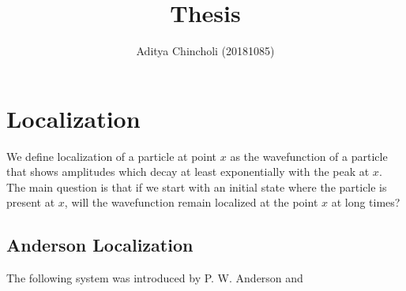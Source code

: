 \documentclass{article}
\title{Thesis}
\author{Aditya Chincholi (20181085)}
\begin{document}
\maketitle




\section{Localization}
We define localization of a particle at point $x$ as the wavefunction of a
particle that shows amplitudes which decay at least exponentially with the peak at $x$. 
The main question is that if we start with an initial state where the
particle is present at $x$, will the wavefunction remain localized at the point $x$
at long times?

\subsection{Anderson Localization}
The following system was introduced by P. W. Anderson and 
\end{document}
